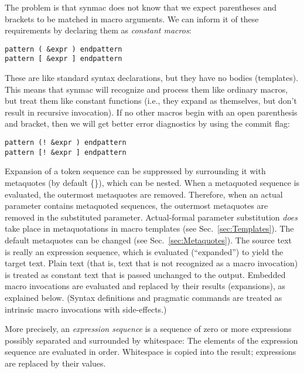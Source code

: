 \documentclass[12pt]{article}
\begin{document}
The problem is that synmac does not know that we expect parentheses and brackets to be matched in macro arguments.
We can inform it of these requirements by declaring them as \emph{constant macros}:
\begin{lstlisting}[frame=single]
pattern ( &expr ) endpattern
pattern [ &expr ] endpattern
\end{lstlisting}
These are like standard syntax declarations, but they have no bodies (templates).
This means that synmac will recognize and process them like ordinary macros, but treat them like constant functions (i.e., they expand as themselves, but don't result in recursive invocation).
If no other macros begin with an open parenthesis and bracket, then we will get better error diagnostics by using the commit flag:
\begin{lstlisting}[frame=single]
pattern (! &expr ) endpattern
pattern [! &expr ] endpattern
\end{lstlisting}

Expansion of a token sequence can be suppressed by surrounding it with metaquotes (by default \{\}), which can be nested. When a metaquoted sequence is evaluated, the outermost metaquotes are removed. Therefore, when an actual parameter contains metaquoted sequences, the outermost metaquotes are removed in the substituted parameter. 
Actual-formal parameter substitution \emph{does} take place in metaquotations in macro templates (see Sec.\ \ref{sec:Templates}).
The default metaquotes can be changed (see Sec.\ \ref{sec:Metaquotes}).
The source text is really an expression sequence, which is evaluated (``expanded'') to yield the target text. Plain text (that is, text that is not recognized as a macro invocation) is treated as constant text that is passed unchanged to the output. Embedded macro invocations are evaluated and replaced by their results (expansions), as explained below. (Syntax definitions and pragmatic commands are treated as intrinsic macro invocations with side-effects.)

More precisely, an \emph{expression sequence} is a sequence of zero or more expressions possibly separated and surrounded by whitespace:
The elements of the expression sequence are evaluated in order. Whitespace is copied into the result; expressions are replaced by their values.
\end{document}
